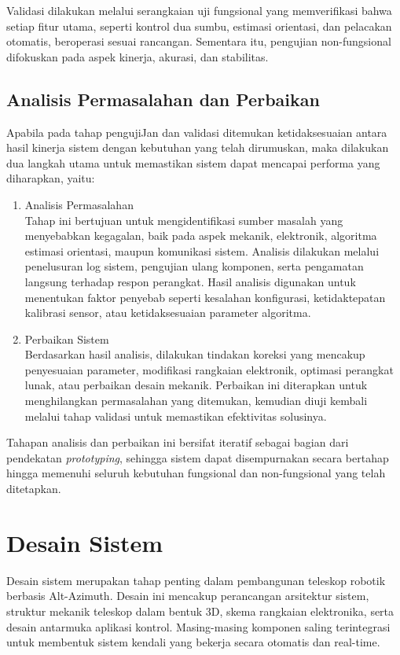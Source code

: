 Validasi dilakukan melalui serangkaian uji fungsional yang memverifikasi bahwa setiap fitur utama, seperti kontrol dua sumbu, estimasi orientasi, dan pelacakan otomatis, beroperasi sesuai rancangan. Sementara itu, pengujian non-fungsional difokuskan pada aspek kinerja, akurasi, dan stabilitas. \par
\subsection{Analisis Permasalahan dan Perbaikan} \label{III.Metode.Perbaikan}

Apabila pada tahap pengujiJan dan validasi ditemukan ketidaksesuaian antara hasil kinerja sistem dengan kebutuhan yang telah dirumuskan, maka dilakukan dua langkah utama untuk memastikan sistem dapat mencapai performa yang diharapkan, yaitu:

\begin{enumerate}[noitemsep]
    \item Analisis Permasalahan \\
    Tahap ini bertujuan untuk mengidentifikasi sumber masalah yang menyebabkan kegagalan, baik pada aspek mekanik, elektronik, algoritma estimasi orientasi, maupun komunikasi sistem. Analisis dilakukan melalui penelusuran log sistem, pengujian ulang komponen, serta pengamatan langsung terhadap respon perangkat. Hasil analisis digunakan untuk menentukan faktor penyebab seperti kesalahan konfigurasi, ketidaktepatan kalibrasi sensor, atau ketidaksesuaian parameter algoritma.

    \item Perbaikan Sistem \\
    Berdasarkan hasil analisis, dilakukan tindakan koreksi yang mencakup penyesuaian parameter, modifikasi rangkaian elektronik, optimasi perangkat lunak, atau perbaikan desain mekanik. Perbaikan ini diterapkan untuk menghilangkan permasalahan yang ditemukan, kemudian diuji kembali melalui tahap validasi untuk memastikan efektivitas solusinya.
\end{enumerate}

Tahapan analisis dan perbaikan ini bersifat iteratif sebagai bagian dari pendekatan \textit{prototyping}, sehingga sistem dapat disempurnakan secara bertahap hingga memenuhi seluruh kebutuhan fungsional dan non-fungsional yang telah ditetapkan.

\section{Desain Sistem} \label{III.DesainSistem}
Desain sistem merupakan tahap penting dalam pembangunan teleskop robotik berbasis Alt-Azimuth. Desain ini mencakup perancangan arsitektur sistem, struktur mekanik teleskop dalam bentuk 3D, skema rangkaian elektronika, serta desain antarmuka aplikasi kontrol. Masing-masing komponen saling terintegrasi untuk membentuk sistem kendali yang bekerja secara otomatis dan real-time.
